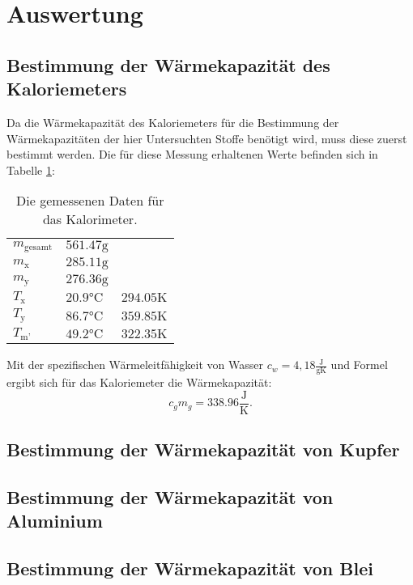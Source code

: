 \section{Auswertung}
\label{sec:Auswertung}
\subsection{Bestimmung der Wärmekapazität des Kaloriemeters}
Da die Wärmekapazität des Kaloriemeters für die Bestimmung der Wärmekapazitäten der hier Untersuchten Stoffe benötigt wird, muss diese zuerst bestimmt werden.
Die für diese Messung erhaltenen Werte befinden sich in Tabelle \ref{tab:t1}:
\begin{table}
	\centering
	\caption{Die gemessenen Daten für das Kalorimeter.}
	\label{tab:t1}
	\begin{tabular}{l l l}
	\toprule

	$m_{\text{gesamt}}$ &  $561.47 \si{\gram}$   & \\
	$m_{\text{x}}$  	&  $285.11 \si{\gram}$   & \\
	$m_{\text{y}}$  	&  $276.36 \si{\gram}$   & \\
	$T_{\text{x}}$  	& $20.9\si{\celsius}$ & $294.05 \si{\kelvin}$ \\
	$T_{\text{y}}$  	& $86.7\si{\celsius}$  & $359.85 \si{\kelvin}$ \\
	$T_{\text{m'}}$ 	& $49.2\si{\celsius}$ & $322.35 \si{\kelvin}$ \\
	\bottomrule
	\end{tabular}
\end{table}
Mit der spezifischen Wärmeleitfähigkeit von Wasser $c_w=4,18 \frac{\si{\joule}}{\si{\gram}\si{\kelvin}}$ \cite{waermeleit} und Formel ergibt sich für das Kaloriemeter die Wärmekapazität:
\begin{equation*}
c_gm_g= 338.96\frac{\si{\joule}}{\si{\kelvin}}.
\end{equation*}
\subsection{Bestimmung der Wärmekapazität von Kupfer}

\subsection{Bestimmung der Wärmekapazität von Aluminium}

\subsection{Bestimmung der Wärmekapazität von Blei}
